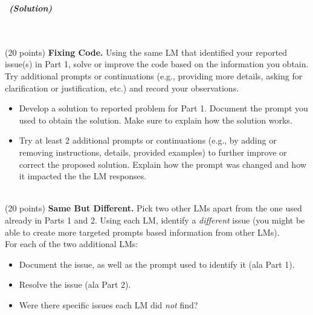 \documentclass[a4 paper]{article}
\numberwithin{equation}{section}
\newcommand{\problem}[2]{~\\\fbox{\textbf{Part #1}}\hfill (#2 points)\newline\newline}
\newcommand{\solution}{~\newline\textbf{\textit{(Solution)}} }
\begin{document}
\solution{}

\\

\problem{2}{20}
\textbf{Fixing Code.}
Using the same LM that identified your reported issue(s) in Part 1, solve or improve the code based on the information you obtain.
Try additional prompts or continuations (e.g., providing more details, asking for clarification or justification, etc.) and record your observations.
\begin{itemize}
    \item Develop a solution to reported problem for Part 1. Document the prompt you used to obtain the solution. Make sure to explain how the solution works.
    
    \item Try at least 2 additional prompts or continuations (e.g., by adding or removing instructions, details, provided examples) to further improve or correct the proposed solution.
    Explain how the prompt was changed and how it impacted the the LM responses.
\end{itemize}


\problem{3}{20}
\textbf{Same But Different.}
Pick two other LMs apart from the one used already in Parts 1 and 2.
Using each LM, identify a \textit{different} issue (you might be able to create more targeted prompts based information from other LMs).\\

For each of the two additional LMs:
\begin{itemize}
    \item Document the issue, as well as the prompt used to identify it (ala Part 1).
    \item Resolve the issue 
    (ala Part 2).
    \item Were there specific issues each LM did \textit{not} find?
\end{itemize}
\end{document}
